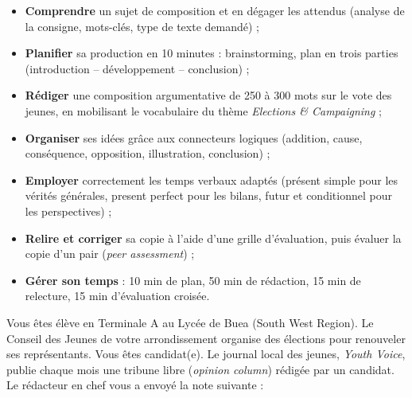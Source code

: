 \documentclass[11pt]{article}
\newcounter{popsec}
\newcounter{popsub}
\newcommand{\courssub}[1]{%
  \stepcounter{popsub}%
  \par\vspace{9pt}\noindent{\popxbold\fontsize{11.5}{13}\selectfont\color{popink}{\color{poporange}\thepopsec.\thepopsub}\hspace{6pt}#1}\par\nopagebreak\vspace{4pt}
}
\begin{document}
\begin{itemize}
\item \textbf{Comprendre} un sujet de composition et en dégager les attendus (analyse de la consigne, mots-clés, type de texte demandé) ;
\item \textbf{Planifier} sa production en 10 minutes : brainstorming, plan en trois parties (introduction -- développement -- conclusion) ;
\item \textbf{Rédiger} une composition argumentative de 250 à 300 mots sur le vote des jeunes, en mobilisant le vocabulaire du thème \emph{Elections \& Campaigning} ;
\item \textbf{Organiser} ses idées grâce aux connecteurs logiques (addition, cause, conséquence, opposition, illustration, conclusion) ;
\item \textbf{Employer} correctement les temps verbaux adaptés (présent simple pour les vérités générales, present perfect pour les bilans, futur et conditionnel pour les perspectives) ;
\item \textbf{Relire et corriger} sa copie à l'aide d'une grille d'évaluation, puis évaluer la copie d'un pair (\emph{peer assessment}) ;
\item \textbf{Gérer son temps} : 10 min de plan, 50 min de rédaction, 15 min de relecture, 15 min d'évaluation croisée.
\end{itemize}

\courssub{Situation}

Vous êtes élève en Terminale A au Lycée de Buea (South West Region). Le Conseil des Jeunes de votre arrondissement organise des élections pour renouveler ses représentants. Vous êtes candidat(e). Le journal local des jeunes, \emph{Youth Voice}, publie chaque mois une tribune libre (\emph{opinion column}) rédigée par un candidat. Le rédacteur en chef vous a envoyé la note suivante :
\end{document}
